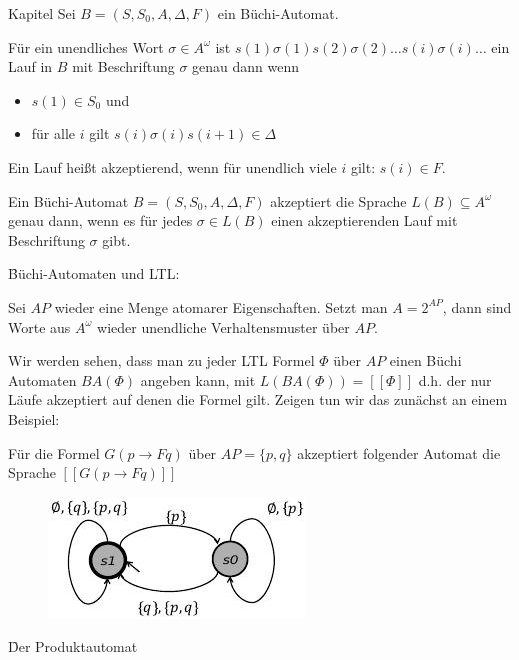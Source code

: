 \begin{chapter}{Kapitel}
\noindent Sei $B=(S,S_0,A,\Delta,F)$ ein Büchi-Automat. 

\noindent Für ein unendliches Wort $\sigma \in A^\omega$ ist $s(1)\sigma(1)s(2)\sigma(2)\dots s(i)\sigma(i)\dots$ ein Lauf in $B$ mit Beschriftung $\sigma$ 
genau dann wenn
\begin{itemize}
 \item $s(1) \in S_0$ und
 \item für alle $i$ gilt $s(i)\sigma(i)s(i+1)\in \Delta$
\end{itemize}
Ein Lauf heißt akzeptierend, wenn für unendlich viele $i$ gilt: $s(i)\in F$. 

Ein Büchi-Automat $B = (S,S_0,A,\Delta,F)$ akzeptiert die Sprache $L(B) \subseteq A^\omega$ genau dann, wenn es für jedes $\sigma\in L(B)$ einen akzeptierenden 
Lauf mit Beschriftung $\sigma$ gibt. 
\vspace*{5pt}

\f{Büchi-Automaten und LTL}:
\vspace*{5pt}

\noindent Sei $AP$ wieder eine Menge atomarer Eigenschaften. Setzt man $A = 2^{AP}$, dann sind Worte aus $A^\omega$ wieder unendliche Verhaltensmuster über $AP$. 
\vspace*{5pt}

\noindent Wir werden sehen, dass man zu jeder LTL Formel $\Phi$ über $AP$ einen Büchi Automaten $BA(\Phi)$ angeben kann, mit $L(BA(\Phi)) = [[\Phi]]$ d.h. der nur
Läufe akzeptiert auf denen die Formel gilt. Zeigen tun wir das zunächst an einem Beispiel:
\vspace*{5pt}

\noindent Für die Formel $G(p \rightarrow Fq)$ über $AP=\{p,q\}$ akzeptiert folgender Automat die Sprache $[[G(p\rightarrow Fq)]]$
\begin{figure}[!ht]
 \centering
 \includegraphics{pics/automatpq}
\end{figure}

\f{Der Produktautomat}
\vspace*{5pt}


\end{chapter}
